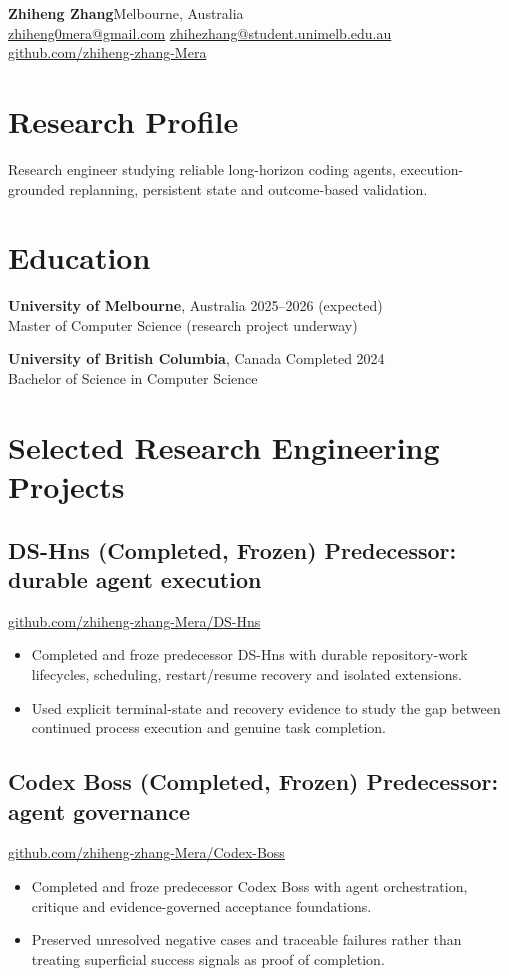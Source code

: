 \documentclass[10pt,a4paper]{article}
\begin{document}
{\LARGE\bfseries Zhiheng Zhang}\hfill Melbourne, Australia\\
\href{mailto:zhiheng0mera@gmail.com}{zhiheng0mera@gmail.com}\quad
\href{mailto:zhihezhang@student.unimelb.edu.au}{zhihezhang@student.unimelb.edu.au}\\
\href{https://github.com/zhiheng-zhang-Mera}{github.com/zhiheng-zhang-Mera}

\section{Research Profile}
Research engineer studying reliable long-horizon coding agents, execution-grounded replanning, persistent state and outcome-based validation.

\section{Education}
\textbf{University of Melbourne}, Australia \hfill 2025--2026 (expected)\\
Master of Computer Science (research project underway)

\textbf{University of British Columbia}, Canada \hfill Completed 2024\\
Bachelor of Science in Computer Science

\section{Selected Research Engineering Projects}
\subsection*{DS-Hns (Completed, Frozen) \hfill \small Predecessor: durable agent execution}
\href{https://github.com/zhiheng-zhang-Mera/DS-Hns}{github.com/zhiheng-zhang-Mera/DS-Hns}
\begin{itemize}
\item Completed and froze predecessor DS-Hns with durable repository-work lifecycles, scheduling, restart/resume recovery and isolated extensions.
\item Used explicit terminal-state and recovery evidence to study the gap between continued process execution and genuine task completion.
\end{itemize}

\subsection*{Codex Boss (Completed, Frozen) \hfill \small Predecessor: agent governance}
\href{https://github.com/zhiheng-zhang-Mera/Codex-Boss}{github.com/zhiheng-zhang-Mera/Codex-Boss}
\begin{itemize}
\item Completed and froze predecessor Codex Boss with agent orchestration, critique and evidence-governed acceptance foundations.
\item Preserved unresolved negative cases and traceable failures rather than treating superficial success signals as proof of completion.
\end{itemize}
\end{document}
